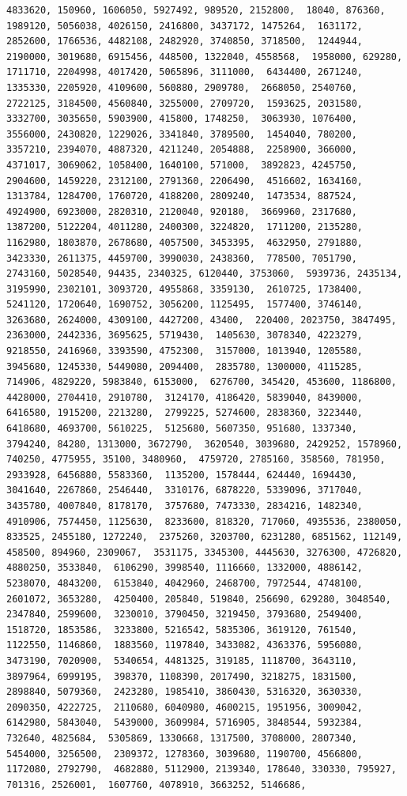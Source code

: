 \documentclass[
]{article}
\begin{document}
\begin{verbatim}
4833620, 150960, 1606050, 5927492, 989520, 2152800,  18040, 876360, 1989120, 5056038, 4026150, 2416800, 3437172, 1475264,  1631172, 2852600, 1766536, 4482108, 2482920, 3740850, 3718500,  1244944, 2190000, 3019680, 6915456, 448500, 1322040, 4558568,  1958000, 629280, 1711710, 2204998, 4017420, 5065896, 3111000,  6434400, 2671240, 1335330, 2205920, 4109600, 560880, 2909780,  2668050, 2540760, 2722125, 3184500, 4560840, 3255000, 2709720,  1593625, 2031580, 3332700, 3035650, 5903900, 415800, 1748250,  3063930, 1076400, 3556000, 2430820, 1229026, 3341840, 3789500,  1454040, 780200, 3357210, 2394070, 4887320, 4211240, 2054888,  2258900, 366000, 4371017, 3069062, 1058400, 1640100, 571000,  3892823, 4245750, 2904600, 1459220, 2312100, 2791360, 2206490,  4516602, 1634160, 1313784, 1284700, 1760720, 4188200, 2809240,  1473534, 887524, 4924900, 6923000, 2820310, 2120040, 920180,  3669960, 2317680, 1387200, 5122204, 4011280, 2400300, 3224820,  1711200, 2135280, 1162980, 1803870, 2678680, 4057500, 3453395,  4632950, 2791880, 3423330, 2611375, 4459700, 3990030, 2438360,  778500, 7051790, 2743160, 5028540, 94435, 2340325, 6120440, 3753060,  5939736, 2435134, 3195990, 2302101, 3093720, 4955868, 3359130,  2610725, 1738400, 5241120, 1720640, 1690752, 3056200, 1125495,  1577400, 3746140, 3263680, 2624000, 4309100, 4427200, 43400,  220400, 2023750, 3847495, 2363000, 2442336, 3695625, 5719430,  1405630, 3078340, 4223279, 9218550, 2416960, 3393590, 4752300,  3157000, 1013940, 1205580, 3945680, 1245330, 5449080, 2094400,  2835780, 1300000, 4115285, 714906, 4829220, 5983840, 6153000,  6276700, 345420, 453600, 1186800, 4428000, 2704410, 2910780,  3124170, 4186420, 5839040, 8439000, 6416580, 1915200, 2213280,  2799225, 5274600, 2838360, 3223440, 6418680, 4693700, 5610225,  5125680, 5607350, 951680, 1337340, 3794240, 84280, 1313000, 3672790,  3620540, 3039680, 2429252, 1578960, 740250, 4775955, 35100, 3480960,  4759720, 2785160, 358560, 781950, 2933928, 6456880, 5583360,  1135200, 1578444, 624440, 1694430, 3041640, 2267860, 2546440,  3310176, 6878220, 5339096, 3717040, 3435780, 4007840, 8178170,  3757680, 7473330, 2834216, 1482340, 4910906, 7574450, 1125630,  8233600, 818320, 717060, 4935536, 2380050, 833525, 2455180, 1272240,  2375260, 3203700, 6231280, 6851562, 112149, 458500, 894960, 2309067,  3531175, 3345300, 4445630, 3276300, 4726820, 4880250, 3533840,  6106290, 3998540, 1116660, 1332000, 4886142, 5238070, 4843200,  6153840, 4042960, 2468700, 7972544, 4748100, 2601072, 3653280,  4250400, 205840, 519840, 256690, 629280, 3048540, 2347840, 2599600,  3230010, 3790450, 3219450, 3793680, 2549400, 1518720, 1853586,  3233800, 5216542, 5835306, 3619120, 761540, 1122550, 1146860,  1883560, 1197840, 3433082, 4363376, 5956080, 3473190, 7020900,  5340654, 4481325, 319185, 1118700, 3643110, 3897964, 6999195,  398370, 1108390, 2017490, 3218275, 1831500, 2898840, 5079360,  2423280, 1985410, 3860430, 5316320, 3630330, 2090350, 4222725,  2110680, 6040980, 4600215, 1951956, 3009042, 6142980, 5843040,  5439000, 3609984, 5716905, 3848544, 5932384, 732640, 4825684,  5305869, 1330668, 1317500, 3708000, 2807340, 5454000, 3256500,  2309372, 1278360, 3039680, 1190700, 4566800, 1172080, 2792790,  4682880, 5112900, 2139340, 178640, 330330, 795927, 701316, 2526001,  1607760, 4078910, 3663252, 5146686, 
\end{verbatim}
\end{document}
